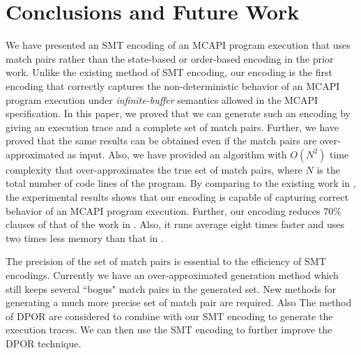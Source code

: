 \section{Conclusions and Future Work}
We have presented an SMT encoding of an MCAPI program execution that uses match pairs rather than the state-based or order-based encoding in the prior work. Unlike the existing method of SMT encoding, our encoding is the first encoding that correctly captures the non-deterministic behavior of an MCAPI program execution under \textit{infinite-buffer} semantics allowed in the MCAPI specification. In this paper, we proved that we can generate such an encoding by giving an execution trace and a complete set of match pairs. Further, we have proved that the same results can be obtained even if the match pairs are over-approximated as input. Also, we have provided an algorithm with $O(N^2)$ time complexity that over-approximates the true set of match pairs, where $N$ is the total number of code lines of the program. By comparing to the existing work in \cite{elwakil:padtad10}, the experimental results shows that our encoding is capable of capturing correct behavior of an MCAPI program execution. Further, our encoding reduces $70\%$ clauses of that of the work in \cite{elwakil:padtad10}. Also, it runs average eight times faster and uses two times less memory than that in \cite{elwakil:padtad10}.

The precision of the set of match pairs is essential to the efficiency of SMT encodings. Currently we have an over-approximated generation method which still keeps several ``bogus" match pairs in the generated set. New methods for generating a much more precise set of match pair are required. Also The method of DPOR are considered to combine with our SMT encoding to generate the execution traces. We can then use the SMT encoding to further improve the DPOR technique.

